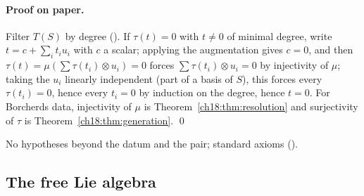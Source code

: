 \paragraph{Proof on paper.}  Filter $T(S)$ by degree ().  If $\tau(t)=0$ with $t\ne0$ of minimal degree,
write $t=c+\sum_it_iu_i$ with $c$ a scalar; applying the augmentation gives $c=0$, and then $\tau(t)=\mu(\sum\tau(t_i)\otimes u_i)=0$ forces
$\sum\tau(t_i)\otimes u_i=0$ by injectivity of $\mu$; taking the $u_i$ linearly independent (part of a basis of $S$), this forces every
$\tau(t_i)=0$, hence every $t_i=0$ by induction on the degree, hence $t=0$.  For Borcherds data,
injectivity of $\mu$ is Theorem~\ref{ch18:thm:resolution} and surjectivity of $\tau$ is Theorem~\ref{ch18:thm:generation}. \qed
\begin{status}No hypotheses beyond the datum and the pair; standard axioms ().\end{status}

\subsection{The free Lie algebra}

